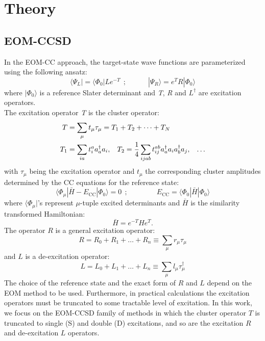 \documentclass[journal=jctcce,manuscript=article]{achemso}
\begin{document}
\section{Theory}

\subsection{EOM-CCSD}
In the EOM-CC approach, the target-state wave functions are parameterized using the
following ansatz:~\cite{sekino1984linear,Stanton:93:EOMCC,CC_EOMCC_Bartlett,krylov_eom_2008}
\begin{equation}
\langle \Psi_L | = \langle \Phi_0 |{L}e^{-T}~~;
\quad \quad \quad | \Psi_R \rangle =  e^{T} {R}| \Phi_0 \rangle 
\end{equation}
where $| \Phi_0 \rangle $ is a reference Slater determinant and \textit{T}, \textit{R} and $L^\dagger$ are excitation operators.\\
The excitation operator \textit{T} is the cluster operator:\cite{Note-1}
\begin{equation}
\begin{aligned}
T &= \sum_{\mu} t_{\mu} \tau_{\mu} = T_1 + T_2 + \dots + T_N \\
T_1 &= \sum_{ia} t_i^a a_a^{\dagger}a_i ,\hspace{0.3cm}  T_2 = \frac{1}{4}\sum_{ijab} t_{ij}^{ab} a_a^{\dagger}a_i a_b^{\dagger}a_j ,\hspace{0.3cm}\dots 
\end{aligned}
\end{equation}
with $\tau_{\mu}$ being the excitation operator and $t_{\mu}$ the corresponding cluster amplitudes determined by the CC equations for the reference state:
\begin{equation}
\langle \Phi_\mu | \bar{H} - E_\text{CC} | \Phi_0 \rangle = 0~~; 
\qquad\qquad E_\text{CC} = \langle \Phi_0| \bar{H} | \Phi_0 \rangle
\end{equation}
where $\langle \Phi_\mu |$'s represent $\mu$-tuple excited determinants and $\bar{H}$ is the similarity transformed Hamiltonian:
\begin{equation}
\bar{H} = e^{-T} H e^{T}.
\end{equation}
The operator $R$ is a general excitation operator:
  \begin{equation}
   R = R_0 + R_1 + \dots + R_n \equiv \sum_\mu r_\mu \tau_\mu
   \end{equation}
and $L$ is a de-excitation operator:
  \begin{equation}
   L = L_0 + L_1 + \dots + L_n \equiv \sum_\mu l_\mu \tau^\dagger_\mu
   \end{equation}
  The choice of the reference state and the exact form of $R$ and $L$ depend on the EOM method to be used\cite{krylov_eom_2008,CC_EOMCC_Bartlett}.
  Furthermore, in practical calculations the excitation {\color{red}{and de-excitation}} operators must be truncated to some tractable level of excitation. 
In this work, we focus on the EOM-CCSD family of methods in which
the cluster operator $T$ is truncated to single (S) and double (D) excitations, and so are the excitation $R$ and de-excitation $L$ operators.
\end{document}
